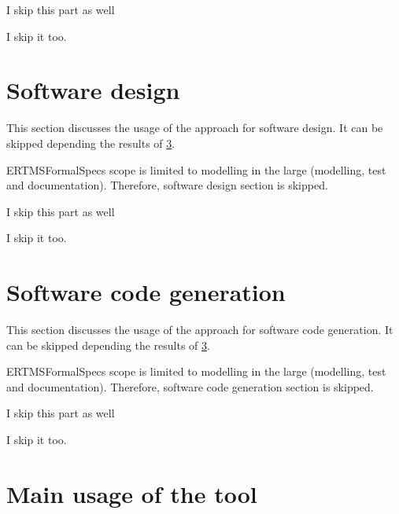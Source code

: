 \begin{assessor1}
I skip this part as well
\end{assessor1}

\begin{assessor2}
I skip it too.
\end{assessor2}


\section{Software design}
This section discusses the usage of the approach for software design.
It can be skipped depending the results of \ref{main_usage}.

\begin{author_comment}
ERTMSFormalSpecs scope is limited to modelling in the large (modelling, test and documentation). Therefore, software design section is skipped.  
\end{author_comment}

\begin{assessor1}
I skip this part as well
\end{assessor1}


\begin{assessor2}
I skip it too.
\end{assessor2}


\section{Software code generation}
This section discusses the usage of the approach for software code generation.
It can be skipped depending the results of \ref{main_usage}.

\begin{author_comment}
ERTMSFormalSpecs scope is limited to modelling in the large (modelling, test and documentation). Therefore, software code generation section is skipped.  
\end{author_comment}

\begin{assessor1}
I skip this part as well
\end{assessor1}


\begin{assessor2}
I skip it too.
\end{assessor2}


\section{Main usage of the tool}
\label{main_usage}


